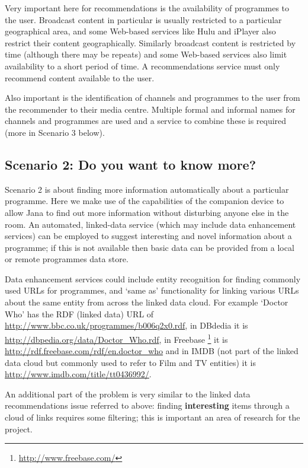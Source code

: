 \documentclass[]{article}%
\begin{document}
Very important here for recommendations is the availability of programmes to the user. Broadcast content in particular is usually restricted to a particular geographical area, and some Web-based services like Hulu and iPlayer also restrict their content geographically. Similarly broadcast content is restricted by time (although there may be repeats) and some Web-based services also limit availability to a short period of time. A recommendations service must only recommend content available to the user.

Also important is the identification of channels and programmes to the user from the recommender to their media centre. Multiple formal and informal names for channels and programmes are used and a service to combine these is required (more in Scenario 3 below).


\subsection{Scenario 2: Do you want to know more?}

Scenario 2 is about finding more information automatically about a particular programme. Here we make use of the capabilities of the companion device to allow Jana to find out more information without disturbing anyone else in the room. An automated, linked-data service (which may include data enhancement services) can be employed to suggest interesting and novel information about a programme; if this is not available then basic data can be provided from a local or remote programmes data store.

Data enhancement services could include entity recognition for finding commonly used URLs for programmes, and `same as' functionality for linking various URLs about the same entity from across the linked data cloud. For example `Doctor Who' has the RDF (linked data) URL of \url{http://www.bbc.co.uk/programmes/b006q2x0.rdf}, in DBdedia it is \url{http://dbpedia.org/data/Doctor_Who.rdf}, in Freebase \footnote{\url{http://www.freebase.com/}} it is \url{http://rdf.freebase.com/rdf/en.doctor_who} and in IMDB (not part of the linked data cloud but commonly used to refer to Film and TV entities) it is \url{http://www.imdb.com/title/tt0436992/}. 

An additional part of the problem is very similar to the linked data recommendations issue referred to above: finding {\bf interesting} items through a cloud of links requires some filtering; this is important an area of research for the project.
\end{document}
